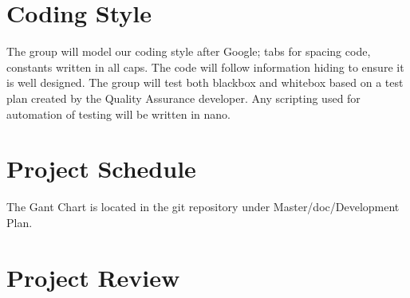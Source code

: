 \documentclass{article}
\begin{document}
\section{Coding Style}
The group will model our coding style after Google; tabs for spacing code, constants written in all caps. The code will follow information hiding to ensure it is well designed. The group will test both blackbox and whitebox based on a test plan created by the Quality Assurance developer. Any scripting used for automation of testing will be written in nano.
\section{Project Schedule}
The Gant Chart is located in the git repository under Master/doc/Development Plan.
\section{Project Review}
\end{document}
